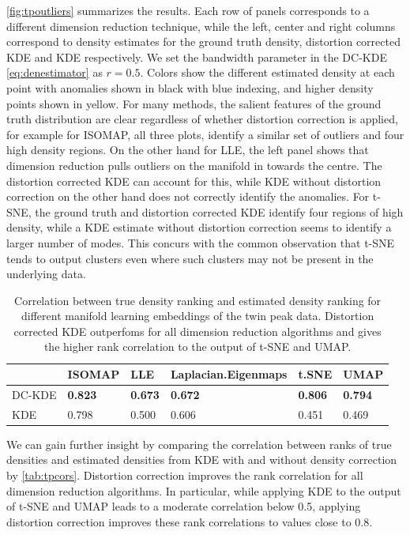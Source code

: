 \documentclass[11pt,a4paper,]{article}
\begin{document}
\autoref{fig:tpoutliers} summarizes the results. Each row of panels corresponds to a different dimension reduction technique, while the left, center and right columns correspond to density estimates for the ground truth density, distortion corrected KDE and KDE respectively. We set the bandwidth parameter in the DC-KDE \eqref{eq:denestimator} as \(r=0.5\). Colors show the different estimated density at each point with anomalies shown in black with blue indexing, and higher density points shown in yellow. For many methods, the salient features of the ground truth distribution are clear regardless of whether distortion correction is applied, for example for ISOMAP, all three plots, identify a similar set of outliers and four high density regions. On the other hand for LLE, the left panel shows that dimension reduction pulls outliers on the manifold in towards the centre. The distortion corrected KDE can account for this, while KDE without distortion correction on the other hand does not correctly identify the anomalies. For t-SNE, the ground truth and distortion corrected KDE identify four regions of high density, while a KDE estimate without distortion correction seems to identify a larger number of modes. This concurs with the common observation that t-SNE tends to output clusters even where such clusters may not be present in the underlying data.

\begin{table}

\caption{\label{tab:tpcors}Correlation between true density ranking and estimated density ranking for different manifold learning embeddings of the twin peak data. Distortion corrected KDE outperfoms for all dimension reduction algorithms and gives the higher rank correlation to the output of t-SNE and UMAP.}
\centering
\begin{tabular}[t]{l>{}l>{}l>{}l>{}l>{}l}
\toprule
  & ISOMAP & LLE & Laplacian.Eigenmaps & t.SNE & UMAP\\
\midrule
DC-KDE & \textbf{0.823} & \textbf{0.673} & \textbf{0.672} & \textbf{0.806} & \textbf{0.794}\\
KDE & 0.798 & 0.500 & 0.606 & 0.451 & 0.469\\
\bottomrule
\end{tabular}
\end{table}

We can gain further insight by comparing the correlation between ranks of true densities and estimated densities from KDE with and without density correction by \autoref{tab:tpcors}. Distortion correction improves the rank correlation for all dimension reduction algorithms. In particular, while applying KDE to the output of t-SNE and UMAP leads to a moderate correlation below 0.5, applying distortion correction improves these rank correlations to values close to 0.8.
\end{document}
